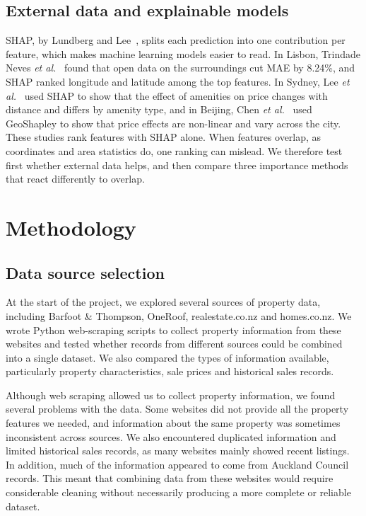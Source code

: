 \documentclass[conference]{IEEEtran}
\begin{document}
\subsection{External data and explainable models}
SHAP, by Lundberg and Lee~\cite{lundberg2017}, splits each prediction
into one contribution per feature, which makes machine learning models
easier to read. In Lisbon, Trindade Neves \textit{et
al.}~\cite{neves2024} found that open data on the surroundings cut MAE
by 8.24\%, and SHAP ranked longitude and latitude among the top
features. In Sydney, Lee \textit{et al.}~\cite{lee2025} used SHAP to show
that the effect of amenities on price changes with distance and differs
by amenity type, and in Beijing, Chen \textit{et
al.}~\cite{chen2025beijing} used GeoShapley to show that price effects
are non-linear and vary across the city. These studies
rank features with SHAP alone. When features overlap, as coordinates and
area statistics do, one ranking can mislead. We therefore test first
whether external data helps, and then compare three importance methods
that react differently to overlap.

\section{Methodology}\label{sec:method}

\subsection{Data source selection}\label{sec:datasource}
At the start of the project, we explored several sources of property
data, including Barfoot \& Thompson, OneRoof, realestate.co.nz and
homes.co.nz. We wrote Python web-scraping scripts to collect property
information from these websites and tested whether records from
different sources could be combined into a single dataset. We also
compared the types of information available, particularly property
characteristics, sale prices and historical sales records.

Although web scraping allowed us to collect property information, we
found several problems with the data. Some websites did not provide all
the property features we needed, and information about the same property
was sometimes inconsistent across sources. We also encountered
duplicated information and limited historical sales records, as many
websites mainly showed recent listings. In addition, much of the
information appeared to come from Auckland Council records. This meant
that combining data from these websites would require considerable
cleaning without necessarily producing a more complete or reliable
dataset.
\end{document}
